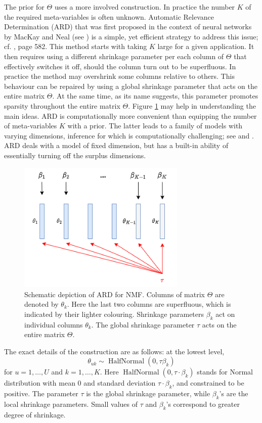 \documentclass[]{article}
\begin{document}
The prior for $\Theta$ uses a more involved construction. In practice the number $K$ of the required meta-variables is often unknown. Automatic Relevance Determination (ARD) that was first proposed in the context of neural networks by MacKay and Neal (see \cite{mackay1995}) is a simple, yet efficient strategy to address this issue; cf. \citet{bishop2006}, page 582. This method starts with taking $K$ large for a given application. It then requires using a different shrinkage parameter per each column of $\Theta$ that effectively switches it off, should the column turn out to be superfluous. In practice the method may overshrink some columns relative to others. This behaviour can be repaired by using a global shrinkage parameter that acts on the entire matrix $\Theta.$ At the same time, as its name suggests, this parameter promotes sparsity throughout the entire matrix $\Theta$. Figure \ref{fig:ARD} may help in understanding the main ideas. ARD is computationally more convenient than equipping the number of meta-variables $K$ with a prior. The latter leads to a family of models with varying dimensions, inference for which is computationally challenging; see \citet{green95} and \citet{godsill2001}. ARD deals with a model of fixed dimension, but has a built-in ability of essentially turning off the surplus dimensions.

\begin{figure}[h]
	\centering
	\includegraphics[width=8cm]{ARD.png}
	\caption{Schematic depiction of ARD for NMF. Columns of matrix $\Theta$ are denoted by $\theta_k$. Here the last two columns are superfluous, which is indicated by their lighter colouring. Shrinkage parameters $\beta_k$ act on individual columns $\theta_k$. The global shrinkage parameter $\tau$ acts on the entire matrix $\Theta$.}
	\label{fig:ARD}
\end{figure}

The exact details of the construction are as follows: at the lowest level,
\[
\theta_{uk} \sim \operatorname{HalfNormal}(0, \tau \beta_k)
\]
for $u=1,\ldots,U$ and $ k = 1,\ldots , K.$ Here $ \operatorname{HalfNormal}(0, \tau \cdot \beta_k)$ stands for Normal distribution with mean $0$ and standard deviation $\tau \cdot \beta_k$, and constrained to be positive. The parameter $\tau$ is the global shrinkage parameter, while $\beta_k$'s are the local shrinkage parameters. Small values of $\tau$ and $\beta_k$'s correspond to greater degree of shrinkage.
\end{document}

